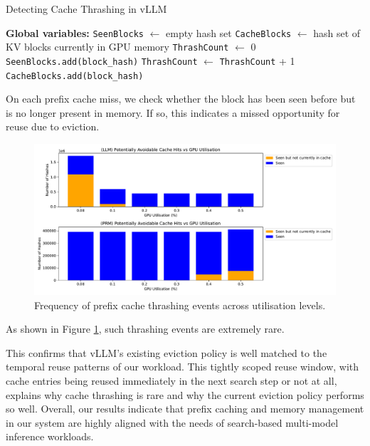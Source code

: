 \documentclass[11pt,twoside]{report}
\begin{document}
\begin{algorithm}[H]\label{alg:cachethrashingdetection}
\caption{Detecting Cache Thrashing in vLLM}
\begin{algorithmic}[1]
\State \textbf{Global variables:}
\State \quad \texttt{SeenBlocks} $\gets$ empty hash set
\State \quad \texttt{CacheBlocks} $\gets$ hash set of KV blocks currently in GPU memory
\State \quad \texttt{ThrashCount} $\gets$ 0
    \State \texttt{SeenBlocks.add(block\_hash)} 
  \Else
      \State \texttt{ThrashCount} $\gets$ \texttt{ThrashCount} + 1 
    \EndIf
  \EndIf
  \State \texttt{CacheBlocks.add(block\_hash)} 
\EndFunction
\end{algorithmic}
\end{algorithm}

On each prefix cache miss, we check whether the block has been seen before but is no longer present in memory. 
If so, this indicates a missed opportunity for reuse due to eviction.

\begin{figure}[htbp]
\centering
\includegraphics[width=\textwidth]{figures/kv_thrashing_stats.pdf}
\caption{Frequency of prefix cache thrashing events across utilisation levels.}
\label{fig:cache_thrashing}
\end{figure}

As shown in Figure \ref{fig:cache_thrashing}, such thrashing events are extremely rare. 

This confirms that vLLM's existing eviction policy is well matched to the temporal reuse patterns of our workload.
This tightly scoped reuse window, with cache entries being reused immediately in the next search step or not at all, explains why cache thrashing is rare and why the current eviction policy performs so well. 
Overall, our results indicate that prefix caching and memory management in our system are highly aligned with the needs of search-based multi-model inference workloads.
\end{document}
